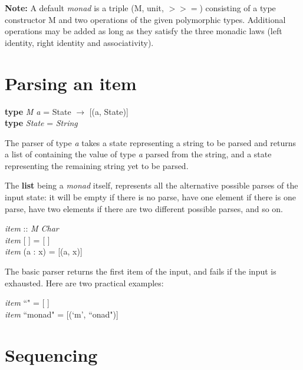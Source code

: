 \documentclass{article}
\begin{document}
   \vspace{5mm}
   
   \textbf{Note:} A default \textit{monad} is a triple (M, unit, $>>=$) consisting of a type constructor M and two operations of the given polymorphic types. Additional operations may be added as long as they satisfy the three monadic laws (left identity, right identity and associativity).
   
   \section*{Parsing an item}
   
   \begin{center}
       \textbf{type} \textit{M a} = State $\rightarrow$ [(a, State)] \\
       \textbf{type} \textit{State} = \textit{String}
   \end{center}
   
   The parser of type \textit{a} takes a state representing a string to be parsed and returns a list of containing the value of type \textit{a} parsed from the string, and a state representing the remaining string yet to be parsed.  
   
   The \textbf{list} being a \textit{monad} itself, represents all the alternative possible parses of the input state: it will be empty if there is no parse, have one element if there is one parse, have two elements if there are two different possible parses, and so on.
   
   \begin{center}
    \textit{item}    :: \textit{M Char} \\
    \textit{item} [ ] = [ ] \\
    \textit{item} (a : x) = [(a, x)]
   \end{center}
   
   The basic parser returns the first item of the input, and fails if the input is exhausted. Here are two practical examples: 
   
   \begin{center}
       \textit{item} ``" = [ ] \\
       \textit{item} ``monad" = [(`m', ``onad")]
   \end{center}
   
   \section*{Sequencing}
   
\end{document}
